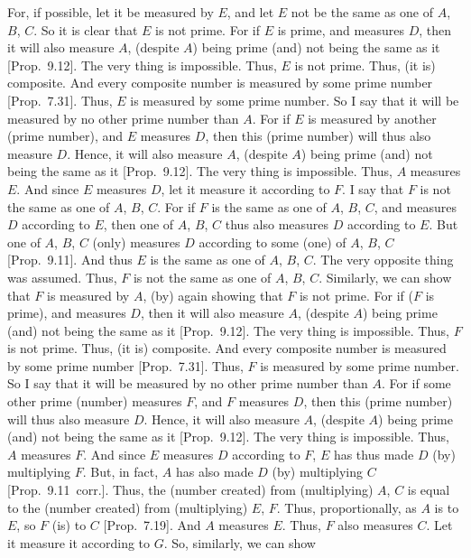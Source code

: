 For, if possible, let it be measured by $E$, and let $E$ not be
the same as one of $A$, $B$, $C$. So it is clear that $E$ is not prime. 
For if $E$ is prime, and measures $D$, then it will also measure $A$, (despite $A$) being prime (and) not being  the same as it [Prop.~9.12]. The very thing is impossible. Thus, $E$
is not prime. Thus, (it is) composite. And every composite
number is measured by some prime number [Prop.~7.31]. Thus, $E$ is measured by some prime number. So I say that it will be measured by no other prime number than $A$.
For if $E$ is measured by another (prime number), and $E$ measures $D$, then this (prime number) will thus also measure $D$. Hence, it will also
measure $A$,  (despite $A$) being prime (and) not being  the same as it [Prop.~9.12]. The very thing is impossible. Thus,
$A$ measures $E$. And since $E$ measures $D$, let it measure it according to $F$. I say that $F$ is not the same as one of $A$, $B$, $C$. For if $F$ is
the same as one of $A$, $B$, $C$, and measures $D$ according to $E$,
then one of $A$, $B$, $C$ thus also measures $D$ according to $E$.
But one of $A$, $B$, $C$ (only) measures $D$ according to some (one) of
$A$, $B$, $C$
[Prop.~9.11]. And thus $E$ is the same as one of
$A$, $B$, $C$. The very opposite thing was assumed. Thus, $F$ is not the
same as one of $A$, $B$, $C$. Similarly, we can show that $F$ is measured by $A$,  (by) again showing that $F$ is not prime. For if ($F$ is prime), and measures $D$,  then it will also measure $A$, (despite $A$) being prime (and) not being  the same as it [Prop.~9.12]. The very thing
is impossible. Thus, $F$ is not prime. Thus, (it is) composite.  And every composite
number is measured by some prime number [Prop.~7.31]. Thus, $F$ is measured by some prime
number. So I say that it will be measured by no other prime number than $A$.
For if  some other prime (number) measures $F$, and $F$ measures $D$, then this (prime number) will thus also measure $D$.  Hence, it will also
measure $A$,  (despite $A$) being prime (and) not being  the same as it [Prop.~9.12]. The very thing is impossible.
Thus, $A$ measures $F$. And since $E$ measures $D$ according to 
$F$, $E$ has thus made $D$ (by) multiplying $F$.  But, in fact, $A$ has
also made $D$ (by) multiplying $C$ [Prop.~9.11~corr.]. Thus, the (number created) from (multiplying)
$A$, $C$ is equal to  the (number created) from (multiplying) $E$, $F$. Thus, proportionally, as $A$ is to $E$, so $F$ (is) to $C$ [Prop.~7.19]. And $A$ measures $E$. Thus, $F$ also
measures $C$. Let it
 measure it according to $G$. So, similarly, we can show
